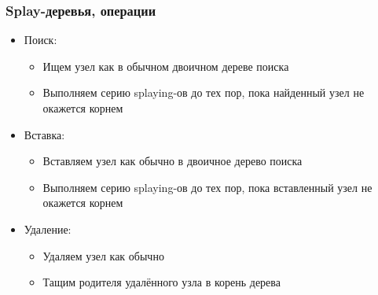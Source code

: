 \documentclass[xetex,mathserif,serif]{beamer}
\begin{document}
    \begin{frame}
        \frametitle{Splay-деревья, операции}
        \begin{itemize}
            \item Поиск:
            \begin{itemize}
                \item Ищем узел как в обычном двоичном дереве поиска
                \item Выполняем серию splaying-ов до тех пор, пока найденный узел не окажется корнем
            \end{itemize}
            \item Вставка:
            \begin{itemize}
                \item Вставляем узел как обычно в двоичное дерево поиска
                \item Выполняем серию splaying-ов до тех пор, пока вставленный узел не окажется корнем
            \end{itemize}
            \item Удаление:
            \begin{itemize}
                \item Удаляем узел как обычно
                \item Тащим родителя удалённого узла в корень дерева
            \end{itemize}
        \end{itemize}
    \end{frame}
\end{document}
